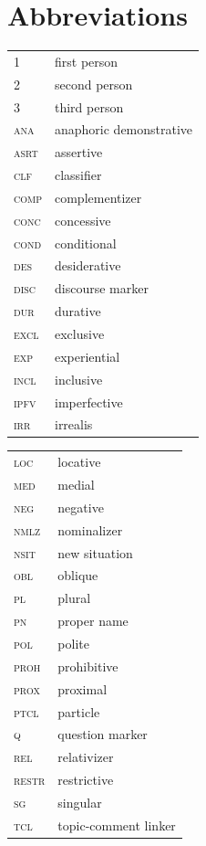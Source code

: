 \documentclass[output=paper,colorlinks,citecolor=brown]{langscibook}
\begin{document}
\section*{Abbreviations}
\begin{tabularx}{.45\textwidth}{lQ}
1 & first person \\
2 & second person \\
3 & third person \\
\textsc{ana} & anaphoric demonstrative \\
\textsc{asrt} & assertive \\
\textsc{clf} & classifier \\
\textsc{comp} & complementizer \\
\textsc{conc} & concessive \\
\textsc{cond} & conditional \\
\textsc{des} & desiderative \\
\textsc{disc} & discourse marker \\
\textsc{dur} & durative \\
\textsc{excl} & exclusive \\
\textsc{exp} & experiential \\
\textsc{incl} & inclusive \\
\textsc{ipfv} & imperfective \\
\textsc{irr} & irrealis \\
\end{tabularx}
\begin{tabularx}{.45\textwidth}{lQ}
\textsc{loc} & locative \\
\textsc{med} & medial \\
\textsc{neg} & negative \\
\textsc{nmlz} & nominalizer \\
\textsc{nsit} & new situation \\
\textsc{obl} & oblique \\
\textsc{pl} & plural \\
\textsc{pn} & proper name \\
\textsc{pol} & polite \\
\textsc{proh} & prohibitive \\
\textsc{prox} & proximal \\
\textsc{ptcl} & particle \\
\textsc{q} & question marker \\
\textsc{rel} & relativizer \\
\textsc{restr} & restrictive \\
\textsc{sg} & singular \\
\textsc{tcl} & topic-comment linker \\
\end{tabularx}
\end{document}
